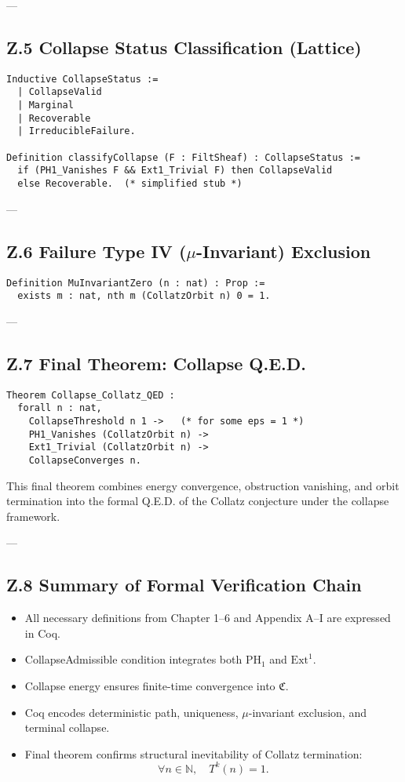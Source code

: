 \documentclass[11pt]{article}
\begin{document}
---

\subsection*{Z.5 Collapse Status Classification (Lattice)}

\begin{lstlisting}[language=Coq]
Inductive CollapseStatus :=
  | CollapseValid
  | Marginal
  | Recoverable
  | IrreducibleFailure.

Definition classifyCollapse (F : FiltSheaf) : CollapseStatus :=
  if (PH1_Vanishes F && Ext1_Trivial F) then CollapseValid
  else Recoverable.  (* simplified stub *)
\end{lstlisting}

---

\subsection*{Z.6 Failure Type IV (\( \mu \)-Invariant) Exclusion}

\begin{lstlisting}[language=Coq]
Definition MuInvariantZero (n : nat) : Prop :=
  exists m : nat, nth m (CollatzOrbit n) 0 = 1.
\end{lstlisting}

---

\subsection*{Z.7 Final Theorem: Collapse Q.E.D.}

\begin{lstlisting}[language=Coq]
Theorem Collapse_Collatz_QED :
  forall n : nat,
    CollapseThreshold n 1 ->   (* for some eps = 1 *)
    PH1_Vanishes (CollatzOrbit n) ->
    Ext1_Trivial (CollatzOrbit n) ->
    CollapseConverges n.
\end{lstlisting}

This final theorem combines energy convergence, obstruction vanishing, and orbit termination into the formal Q.E.D. of the Collatz conjecture under the collapse framework.

---

\subsection*{Z.8 Summary of Formal Verification Chain}

\begin{itemize}
  \item All necessary definitions from Chapter 1–6 and Appendix A–I are expressed in Coq.
  \item CollapseAdmissible condition integrates both \( \mathrm{PH}_1 \) and \( \mathrm{Ext}^1 \).
  \item Collapse energy ensures finite-time convergence into \( \mathfrak{C} \).
  \item Coq encodes deterministic path, uniqueness, \( \mu \)-invariant exclusion, and terminal collapse.
  \item Final theorem confirms structural inevitability of Collatz termination:  
    \[
    \forall n \in \mathbb{N},\quad T^k(n) = 1.
    \]
\end{itemize}
\end{document}
